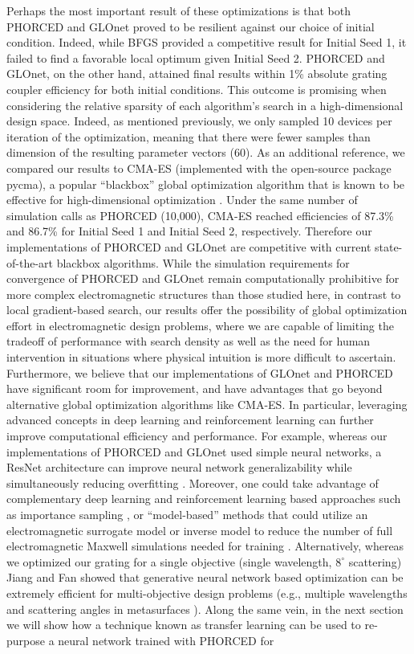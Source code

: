 \documentclass{article}
\begin{document}
Perhaps the most important result of these optimizations is that both PHORCED and GLOnet proved to be resilient against our choice of initial condition. Indeed, while BFGS provided a competitive result for Initial Seed 1, it failed to find a favorable local optimum given Initial Seed 2. PHORCED and GLOnet, on the other hand, attained final results within 1\% absolute grating coupler efficiency for both initial conditions. This outcome is promising when considering the relative sparsity of each algorithm's search in a high-dimensional design space. Indeed, as mentioned previously, we only sampled 10 devices per iteration of the optimization, meaning that there were fewer samples than dimension of the resulting parameter vectors (60). As an additional reference, we compared our results to CMA-ES (implemented with the open-source package pycma), a popular ``blackbox'' global optimization algorithm that is known to be effective for high-dimensional optimization \cite{hansen_cma_2016}. Under the same number of simulation calls as PHORCED (10,000), CMA-ES reached efficiencies of 87.3\% and 86.7\% for Initial Seed 1 and Initial Seed 2, respectively. Therefore our implementations of PHORCED and GLOnet are competitive with current state-of-the-art blackbox algorithms. While the simulation requirements for convergence of PHORCED and GLOnet remain computationally prohibitive for more complex electromagnetic structures than those studied here, in contrast to local gradient-based search, our results offer the possibility of global optimization effort in electromagnetic design problems, where we are capable of limiting the tradeoff of performance with search density as well as the need for human intervention in situations where physical intuition is more difficult to ascertain. Furthermore, we believe that our implementations of GLOnet and PHORCED have significant room for improvement, and have advantages that go beyond alternative global optimization algorithms like CMA-ES. In particular, leveraging advanced concepts in deep learning and reinforcement learning can further improve computational efficiency and performance. For example, whereas our implementations of PHORCED and GLOnet used simple neural networks, a ResNet architecture can improve neural network generalizability while simultaneously reducing overfitting \cite{jiang_deep_2020}. Moreover, one could take advantage of complementary deep learning and reinforcement learning based approaches such as importance sampling \cite{faury_improving_2019, sutton2018reinforcement}, or ``model-based'' methods that could utilize an electromagnetic surrogate model or inverse model to reduce the number of full electromagnetic Maxwell simulations needed for training \cite{pestourie_active_2020, hegde_deep_2020, kojima_deep_2021, tahersima_deep_2019}. Alternatively, whereas we optimized our grating for a single objective (single wavelength, $8^\circ$ scattering) Jiang and Fan showed that generative neural network based optimization can be extremely efficient for multi-objective design problems (e.g., multiple wavelengths and scattering angles in metasurfaces \cite{jiang_global_2019}). Along the same vein, in the next section we will show how a technique known as transfer learning can be used to re-purpose a neural network trained with PHORCED for 
\end{document}
